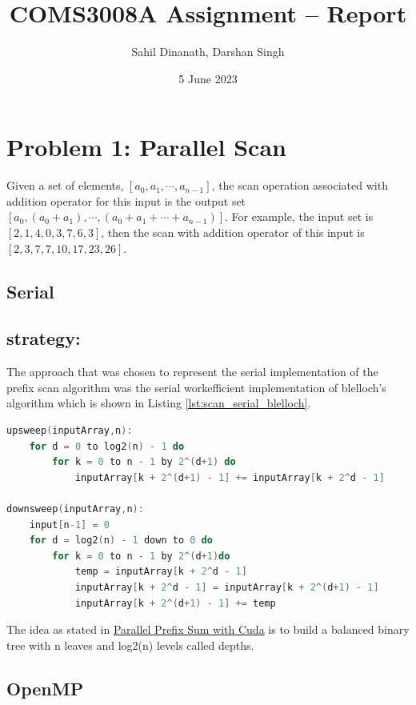 
\title{COMS3008A Assignment -- Report}
\author{Sahil Dinanath, Darshan Singh}
\date{5 June 2023} 
\maketitle 
\pagestyle{fancy}
\fancyhf{}
\fancyhead[R]{\thepage}
{} 
\section{Problem 1: Parallel Scan}
	 Given a set of elements, $[a_0,a_1,\dotsm,a_{n-1}]$, the scan operation associated with addition operator for this input is the output set $[a_0,(a_0+a_1),\dotsm,(a_0+a_1+\dotsm+a_{n-1})]$. 
	 For example, the input set is $[2,1,4,0,3,7,6,3]$, then the scan with addition operator of this input is $[2,3,7,7,10,17,23,26]$. 
\subsection{Serial} 
\subsection*{strategy:}
The approach that was chosen to represent the serial implementation of the prefix scan algorithm was the serial workefficient implementation of blelloch's algorithm which is shown in Listing \ref{lst:scan_serial_blelloch}. 
\begin{lstlisting}[language=C, caption={upsweep and downsweep pseudocode}, label={lst:scan_serial_blelloch}]
upsweep(inputArray,n):
	for d = 0 to log2(n) - 1 do
    	for k = 0 to n - 1 by 2^(d+1) do
        	inputArray[k + 2^(d+1) - 1] += inputArray[k + 2^d - 1]

downsweep(inputArray,n):
	input[n-1] = 0
	for d = log2(n) - 1 down to 0 do 
		for k = 0 to n - 1 by 2^(d+1)do 
			temp = inputArray[k + 2^d - 1] 
			inputArray[k + 2^d - 1] = inputArray[k + 2^(d+1) - 1]
			inputArray[k + 2^(d+1) - 1] += temp
\end{lstlisting}
The idea as stated in \href{https://developer.nvidia.com/gpugems/gpugems3/part-vi-gpu-computing/chapter-39-parallel-prefix-sum-scan-cuda}{Parallel Prefix Sum with Cuda} is to build a balanced binary tree with n leaves and log2(n) levels called depths.
\subsection{OpenMP}
